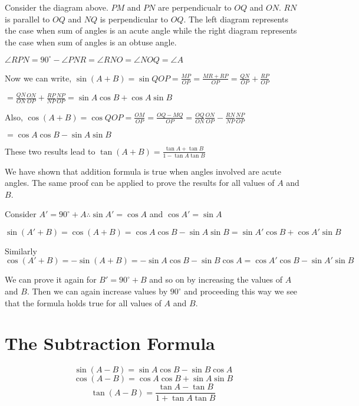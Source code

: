 Consider the diagram above. $PM$ and $PN$ are perpendicualr to $OQ$ and $ON$. $RN$ is parallel to
$OQ$ and $NQ$ is perpendicular to $OQ$. The left diagram represents the case when sum of angles is an acute angle
while the right diagram represents the case when sum of angles is an obtuse angle.

$\angle RPN = 90^{\circ} - \angle PNR = \angle RNO = \angle NOQ = \angle A$

Now we can write, $\sin(A + B) = \sin QOP = \frac{MP}{OP} = \frac{MR + RP}{OP} = \frac{QN}{OP} + \frac{RP}{OP}$

$=\frac{QN}{ON}\frac{ON}{OP} + \frac{RP}{NP}\frac{NP}{OP} = \sin A\cos B + \cos A\sin B$

Also, $\cos(A + B) = \cos QOP = \frac{OM}{OP} = \frac{OQ - MQ}{OP} = \frac{OQ}{ON}\frac{ON}{OP} - \frac{RN}{NP}\frac{NP}{OP}$

$= \cos A\cos B - \sin A\sin B$

These two results lead to $\tan (A + B) = \frac{\tan A + \tan B}{1 - \tan A\tan B}$

We have shown that addition formula is true when angles involved are acute angles. The same proof can be applied to prove the
results for all values of $A$ and $B$.

Consider $A' = 90^{\circ} + A \therefore \sin A' = \cos A$ and $\cos A' = \sin A$

$\sin(A' + B) = \cos (A + B) = \cos A\cos B - \sin A\sin B = \sin A'\cos B + \cos A'\sin B$

Similarly $\cos(A' + B) = -\sin(A + B) = -\sin A\cos B - \sin B\cos A = \cos A'\cos B - \sin A'\sin B$

We can prove it again for $B' = 90^{\circ} + B$ and so on by increasing the values of $A$ and $B$. Then we can
again increase values by $90^{\circ}$ and proceeding this way we see that the formula holds true for all values of $A$
and $B$.

\section{The Subtraction Formula}
$$\sin(A - B) = \sin A\cos B - \sin B\cos A$$
$$\cos(A - B) = \cos A\cos B + \sin A\sin B$$
$$\tan(A - B) = \frac{\tan A - \tan B}{1 + \tan A\tan B}$$

